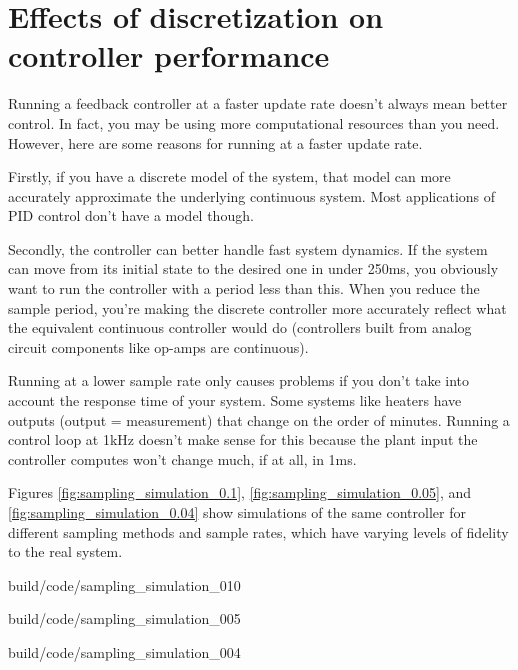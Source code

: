 \section{Effects of discretization on controller performance}

Running a feedback controller at a faster update rate doesn't always mean better
control. In fact, you may be using more computational resources than you need.
However, here are some reasons for running at a faster update rate.

Firstly, if you have a discrete model of the system, that model can more
accurately approximate the underlying continuous system. Most applications of
PID control don't have a model though.

Secondly, the controller can better handle fast system dynamics. If the system
can move from its initial state to the desired one in under 250ms, you obviously
want to run the controller with a period less than this. When you reduce the
sample period, you're making the discrete controller more accurately reflect
what the equivalent continuous controller would do (controllers built from
analog circuit components like op-amps are continuous).

Running at a lower sample rate only causes problems if you don't take into
account the response time of your system. Some systems like heaters have outputs
(output = measurement) that change on the order of minutes. Running a control
loop at 1kHz doesn't make sense for this because the plant input the controller
computes won't change much, if at all, in 1ms.

Figures \ref{fig:sampling_simulation_0.1}, \ref{fig:sampling_simulation_0.05},
and \ref{fig:sampling_simulation_0.04} show simulations of the same controller
for different sampling methods and sample rates, which have varying levels of
fidelity to the real system.

\begin{svg}{build/code/sampling_simulation_010}
  \caption{Sampling methods for system simulation with $T = 0.1s$}
  \label{fig:sampling_simulation_0.1}
\end{svg}

\begin{svg}{build/code/sampling_simulation_005}
  \caption{Sampling methods for system simulation with $T = 0.05s$}
  \label{fig:sampling_simulation_0.05}
\end{svg}

\begin{svg}{build/code/sampling_simulation_004}
  \caption{Sampling methods for system simulation with $T = 0.04s$}
  \label{fig:sampling_simulation_0.04}
\end{svg}

